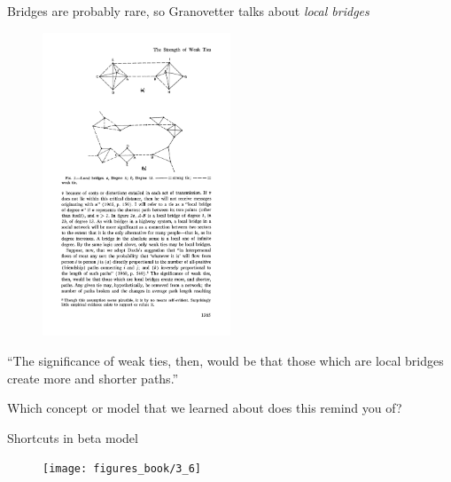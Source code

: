 \documentclass[aspectratio=169]{beamer}
\begin{document}
\begin{frame}

Bridges are probably rare, so Granovetter talks about \emph{local bridges}

\begin{figure}
\includegraphics[width=0.5\textwidth]{figures/granovetter_strength_1973_fig2}
\end{figure}


\end{frame}
\begin{frame}

``The significance of weak ties, then, would be that those which are local bridges create more and shorter paths.''

Which concept or model that we learned about does this remind you of? 

\pause

Shortcuts in beta model

\begin{figure}
\texttt{[image: figures\_book/3\_6]}
\end{figure}


\end{frame}
\end{document}

